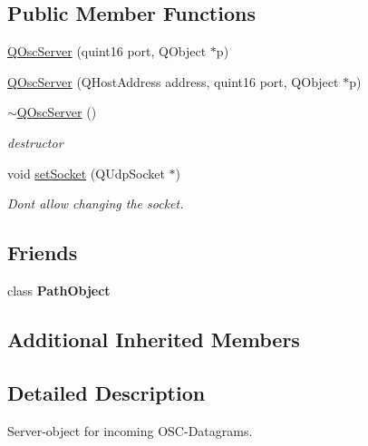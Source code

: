 \subsection*{Public Member Functions}
\begin{DoxyCompactItemize}
\item 
\hyperlink{class_q_osc_server_a716b6c146062536a806f0ba4ebea89f3}{Q\+Osc\+Server} (quint16 port, Q\+Object $\ast$p)
\item 
\hyperlink{class_q_osc_server_aa16761b226471d81b82c6e578506f16b}{Q\+Osc\+Server} (Q\+Host\+Address address, quint16 port, Q\+Object $\ast$p)
\item 
\mbox{\label{class_q_osc_server_a0723e8d25b0a7612c376ce98104a4b98}} 
\hyperlink{class_q_osc_server_a0723e8d25b0a7612c376ce98104a4b98}{$\sim$\+Q\+Osc\+Server} ()
\begin{DoxyCompactList}\small\item\em destructor \end{DoxyCompactList}\item 
\mbox{\label{class_q_osc_server_a0de8ba53d4f5638402dbdcd2e1fa9ca0}} 
void \hyperlink{class_q_osc_server_a0de8ba53d4f5638402dbdcd2e1fa9ca0}{set\+Socket} (Q\+Udp\+Socket $\ast$)
\begin{DoxyCompactList}\small\item\em Don\textquotesingle{}t allow changing the socket. \end{DoxyCompactList}\end{DoxyCompactItemize}
\subsection*{Friends}
\begin{DoxyCompactItemize}
\item 
\mbox{\label{class_q_osc_server_ae75cba4fd727e5044b2d3792f0597c00}} 
class {\bfseries Path\+Object}
\end{DoxyCompactItemize}
\subsection*{Additional Inherited Members}


\subsection{Detailed Description}
Server-\/object for incoming O\+S\+C-\/\+Datagrams. 

